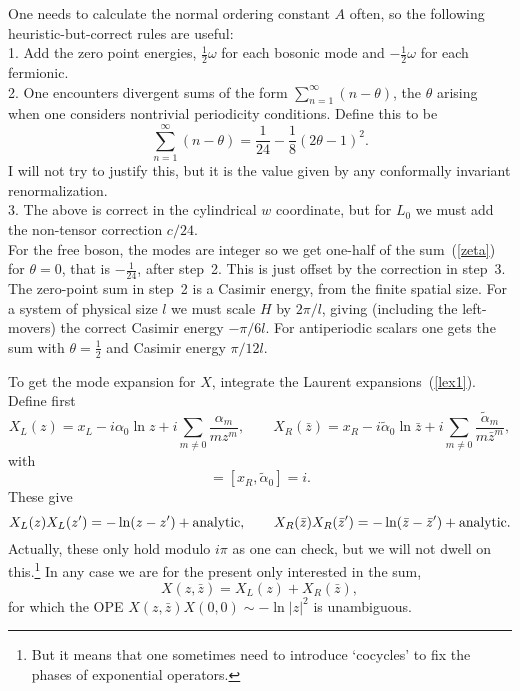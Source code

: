 One needs to calculate the normal ordering constant $A$ often, so the
following heuristic-but-correct rules are useful:\\[3pt]
\label{rulesec}
1. Add the zero point energies, $\frac{1}{2} \omega$
for each bosonic mode and $- \frac{1}{2} \omega$ for each
fermionic.\\[3pt]
2. One encounters divergent sums of the form
$\sum_{n=1}^\infty (n - \theta)$, the $\theta$ arising when one
considers nontrivial periodicity conditions.  Define this to be
\begin{equation}
\sum_{n=1}^\infty (n - \theta) = \frac{1}{24} - 
\frac{1}{8} (2 \theta - 1)^2. \label{zeta}
\end{equation}
I will not try to justify this, but it is the value given by
any conformally invariant renormalization.\\[3pt]
3. The above is correct in the cylindrical $w$
coordinate, but for $L_0$ we must add the non-tensor correction
$c/24$.\\[3pt] For the free boson, the modes are integer so we get
one-half of the sum~(\ref{zeta}) for $\theta = 0$, that is
$-\frac{1}{24}$, after step~2.  This is just offset by the correction
in step~3.  The zero-point sum in step~2 is a Casimir energy, from the
finite spatial size.  For a system of physical size $l$ we must
scale $H$ by $2\pi/l$, giving (including the left-movers) the
correct Casimir energy $-\pi/6l$.  For antiperiodic scalars one
gets the sum with $\theta = \frac{1}{2}$ and Casimir energy
$\pi/12 l$.

To get the mode expansion for $X$, integrate
the Laurent expansions~(\ref{lex1}).  Define first
\begin{equation}
X_L(z) = x_L - i \alpha_0 \ln z
+ i \sum_{m \neq 0} \frac{\alpha_m}{mz^{m}}, \qquad
X_R(\bar z) = x_R - i\tilde\alpha_0 \ln\bar z +
i\sum_{m \neq 0}
\frac{\tilde\alpha_m}{m\bar z^{m}}, \label{lex2}
\end{equation}
with
\begin{equation}
[ x_L, \alpha_0 ] = [x_R, \tilde\alpha_0] = i.
\end{equation}
These give
\begin{equation}
X_L(z) X_L(z') = -\ln (z-z') + {\rm analytic},
\qquad
X_R(\bar z) X_R(\bar z') = -\ln (\bar z - \bar z') + {\rm analytic}.
\end{equation}
Actually, these only hold modulo $i\pi$ as one can check, but we
will not dwell on this.\footnote{But it means that one sometimes
need to introduce `cocycles' to fix the phases of exponential
operators.}  In any case we are for the present only interested in
the sum,
\begin{equation}
X(z,\bar z) = X_L(z) + X_R(\bar z),
\end{equation}
for which the OPE $X(z,\bar z) X(0,0) \sim - \ln|z|^2$ is
unambiguous.

